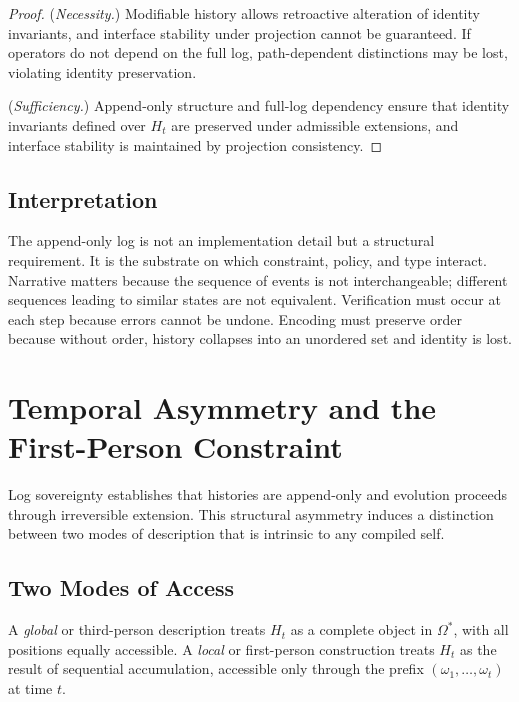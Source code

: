 \documentclass[12pt, a4paper]{article}
\theoremstyle{plain}
\theoremstyle{definition}
\theoremstyle{remark}
\begin{document}
\begin{proof}
(\textit{Necessity.}) Modifiable history allows retroactive alteration of identity invariants, and interface stability under projection cannot be guaranteed. If operators do not depend on the full log, path-dependent distinctions may be lost, violating identity preservation.

(\textit{Sufficiency.}) Append-only structure and full-log dependency ensure that identity invariants defined over $H_t$ are preserved under admissible extensions, and interface stability is maintained by projection consistency.
\end{proof}

\subsection{Interpretation}

The append-only log is not an implementation detail but a structural requirement. It is the substrate on which constraint, policy, and type interact. Narrative matters because the sequence of events is not interchangeable; different sequences leading to similar states are not equivalent. Verification must occur at each step because errors cannot be undone. Encoding must preserve order because without order, history collapses into an unordered set and identity is lost.

\section{Temporal Asymmetry and the First-Person Constraint}

Log sovereignty establishes that histories are append-only and evolution proceeds through irreversible extension. This structural asymmetry induces a distinction between two modes of description that is intrinsic to any compiled self.

\subsection{Two Modes of Access}

A \emph{global} or third-person description treats $H_t$ as a complete object in $\Omega^*$, with all positions equally accessible. A \emph{local} or first-person construction treats $H_t$ as the result of sequential accumulation, accessible only through the prefix $(\omega_1, \dots, \omega_t)$ at time $t$.
\end{document}
